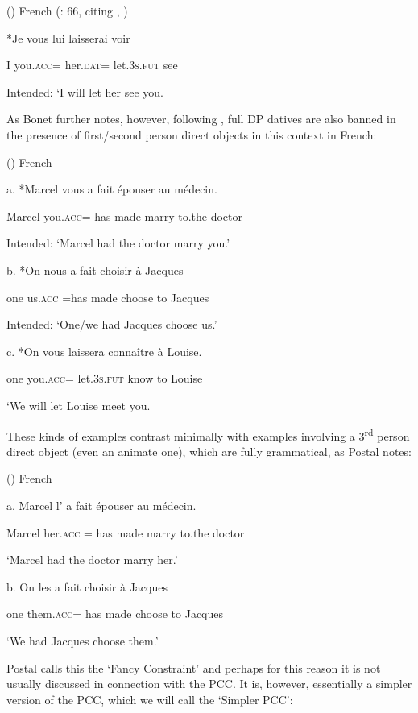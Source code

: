 \documentclass[output=paper,modfonts,nonflat]{langsci/langscibook}
\begin{document}
()  French (\citealt{Rezac2008}: 66, citing \citealt{Postal1981}, \citealt{Quicoli1984})

  *Je   vous     lui           laisserai   voir

    I      you.\textsc{acc}=     her.\textsc{dat=}   let.3\textsc{s}.\textsc{fut}    see

  Intended: ‘I will let her see you. 

As Bonet further notes, however, following \citet{Postal1989}, full DP datives are also banned in the presence of first/second person direct objects in this context in French:

()  French \citep[2]{Postal1989}

  a.  *Marcel vous   a   fait   épouser   au     médecin.

    Marcel   you.\textsc{acc}=  has   made   marry   to.the   doctor

    Intended: ‘Marcel had the doctor marry you.’

  b.   *On   nous     a   fait     choisir   à Jacques

    one     us.\textsc{acc} =has   made   choose   to Jacques

  Intended: ‘One/we had Jacques choose us.’

  c.   *On   vous   laissera   connaître   à Louise.

    one   you\textsc{.acc}=  let.\textsc{3s.fut} know     to Louise

    ‘We will let Louise meet you.

These kinds of examples contrast minimally with examples involving a 3\textsuperscript{rd} person direct object (even an animate one), which are fully grammatical, as Postal notes:

()  French \citep[2]{Postal1989}

  a.  Marcel   l’       a  fait    épouser   au     médecin.

    Marcel   her\textsc{.acc} =  has  made    marry   to.the   doctor

     ‘Marcel had the doctor marry her.’

b.   On   les       a   fait     choisir   à Jacques

    one   them.\textsc{acc}=  has   made   choose   to Jacques

   ‘We had Jacques choose them.’

Postal calls this the ‘Fancy Constraint’ and perhaps for this reason it is not usually discussed in connection with the PCC. It is, however, essentially a simpler version of the PCC, which we will call the ‘Simpler PCC’:
\end{document}
